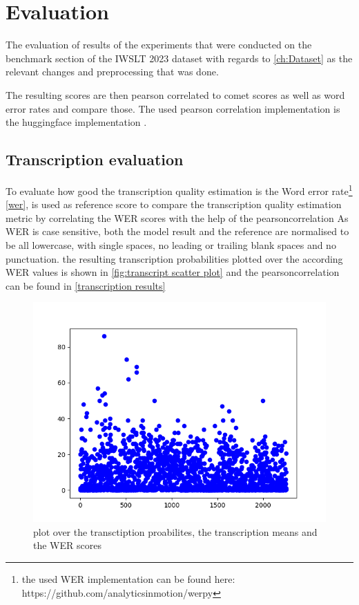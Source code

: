 
\chapter{Evaluation}
\label{ch:Evaluation}
The evaluation of results of the experiments that were conducted on the benchmark section of the IWSLT 2023 dataset \cite{sperber2024evaluating} with regards to \autoref{ch:Dataset} as the relevant changes and preprocessing that was done.

The resulting scores are then pearson correlated \cite{2020SciPy-NMeth} to comet scores as well as word error rates and compare those. The used pearson correlation implementation is the huggingface implementation \cite{huggingfacepearsonr}.


\section{Transcription evaluation}
To evaluate how good the transcription quality estimation is the Word error rate\footnote{the used WER implementation can be found here: https://github.com/analyticsinmotion/werpy} \autoref{wer}, is used as reference score to compare the transcription quality estimation metric by correlating the WER scores with the help of the pearsoncorrelation \cite{2020SciPy-NMeth}
As WER is case sensitive, both the model result and the reference are normalised to be all lowercase, with single spaces, no leading or trailing blank spaces and no punctuation.
the resulting transcription probabilities plotted over the according WER values is shown in \autoref{fig:transcript scatter plot} and the pearsoncorrelation can be found in \autoref{transcription results}
\begin{figure}
    \centering%
    \includegraphics[width=0.5\linewidth]{Latex/sections/images/seamlesswerref.png}
    \caption{plot over the transctiption proabilites, the transcription means and the WER scores}
    \label{fig:transcript scatter plot}
\end{figure}

